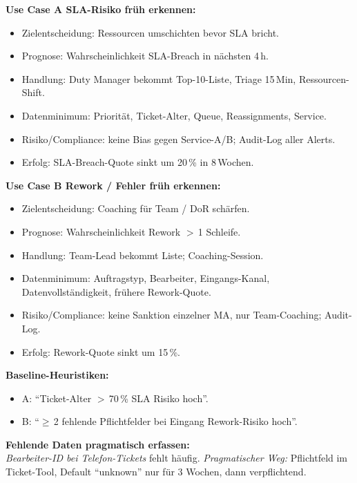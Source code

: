 \documentclass[11pt,a4paper,oneside]{article}
\begin{document}
\begin{loesungbox}
\textbf{Use Case A \textendash{} SLA-Risiko fr\"uh erkennen:}
\begin{itemize}
  \item Zielentscheidung: Ressourcen umschichten bevor SLA bricht.
  \item Prognose: Wahrscheinlichkeit SLA-Breach in n\"achsten 4\,h.
  \item Handlung: Duty Manager bekommt Top-10-Liste, Triage 15\,Min, Ressourcen-Shift.
  \item Datenminimum: Priorit\"at, Ticket-Alter, Queue, Reassignments, Service.
  \item Risiko/Compliance: keine Bias gegen Service-A/B; Audit-Log aller Alerts.
  \item Erfolg: SLA-Breach-Quote sinkt um 20\,\% in 8\,Wochen.
\end{itemize}

\smallskip
\textbf{Use Case B \textendash{} Rework / Fehler fr\"uh erkennen:}
\begin{itemize}
  \item Zielentscheidung: Coaching f\"ur Team / DoR sch\"arfen.
  \item Prognose: Wahrscheinlichkeit Rework $>$\,1 Schleife.
  \item Handlung: Team-Lead bekommt Liste; Coaching-Session.
  \item Datenminimum: Auftragstyp, Bearbeiter, Eingangs-Kanal, Datenvollst\"andigkeit, fr\"uhere Rework-Quote.
  \item Risiko/Compliance: keine Sanktion einzelner MA, nur Team-Coaching; Audit-Log.
  \item Erfolg: Rework-Quote sinkt um 15\,\%.
\end{itemize}

\smallskip
\textbf{Baseline-Heuristiken:}
\begin{itemize}
  \item A: ``Ticket-Alter $>$\,70\,\% SLA \textrightarrow{} Risiko hoch''.
  \item B: ``$\geq$\,2 fehlende Pflichtfelder bei Eingang \textrightarrow{} Rework-Risiko hoch''.
\end{itemize}

\smallskip
\textbf{Fehlende Daten pragmatisch erfassen:}\\
\emph{Bearbeiter-ID bei Telefon-Tickets} fehlt h\"aufig. \emph{Pragmatischer Weg:} Pflichtfeld im Ticket-Tool, Default ``unknown'' nur f\"ur 3 Wochen, dann verpflichtend.
\end{loesungbox}
\end{document}
